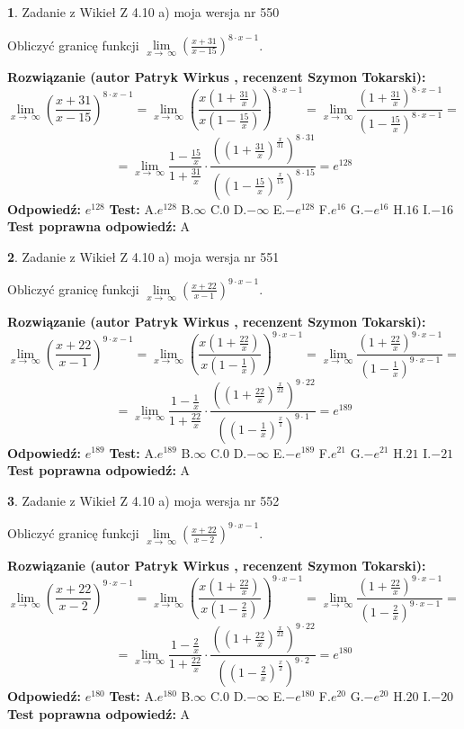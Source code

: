\documentclass[12pt, a4paper]{article}
\theoremstyle{definition} %
\newtheorem{zad}{}
\newcommand{\zadStart}[1]{\begin{zad}#1\newline}
\newcommand{\zadStop}{\end{zad}}
\newcommand{\rozwStart}[2]{\noindent \textbf{Rozwiązanie (autor #1 , recenzent #2): }\newline}
\newcommand{\rozwStop}{\newline}
\newcommand{\odpStart}{\noindent \textbf{Odpowiedź:}\newline}
\newcommand{\odpStop}{\newline}
\newcommand{\testStart}{\noindent \textbf{Test:}\newline}
\newcommand{\testStop}{\newline}
\newcommand{\kluczStart}{\noindent \textbf{Test poprawna odpowiedź:}\newline}
\newcommand{\kluczStop}{\newline}
\begin{document}
\zadStart{Zadanie z Wikieł Z 4.10 a) moja wersja nr 550}

Obliczyć granicę funkcji  $\lim\limits_{x\to\ \infty}(\frac{x+31}{x-15})^{8\cdot x-1}$.
\zadStop
\rozwStart{Patryk Wirkus}{Szymon Tokarski}
$$\lim\limits_{x\to\ \infty}(\frac{x+31}{x-15})^{8\cdot x-1} = \lim\limits_{x\to\ \infty}(\frac{x(1+\frac{31}{x})}{x(1-\frac{15}{x})})^{8\cdot x-1}=\lim\limits_{x\to\ \infty}\frac{(1+\frac{31}{x})^{8\cdot x-1}}{(1-\frac{15}{x})^{8\cdot x-1}}=$$
$$=\lim\limits_{x\to\ \infty}\frac{1-\frac{15}{x}}{1+\frac{31}{x}}\cdot\frac{((1+\frac{31}{x})^{\frac{x}{31}})^{8\cdot31}}{((1-\frac{15}{x})^{\frac{x}{15}})^{8\cdot15}}=e^{128}$$
\rozwStop
\odpStart
$e^{128}$
\odpStop
\testStart
A.$e^{128}$ B.$\infty$ C.$0$ D.$-\infty$ E.$-e^{128}$
F.$e^{16}$ G.$-e^{16}$
H.$16$
I.$-16$
\testStop
\kluczStart
A
\kluczStop



\zadStart{Zadanie z Wikieł Z 4.10 a) moja wersja nr 551}

Obliczyć granicę funkcji  $\lim\limits_{x\to\ \infty}(\frac{x+22}{x-1})^{9\cdot x-1}$.
\zadStop
\rozwStart{Patryk Wirkus}{Szymon Tokarski}
$$\lim\limits_{x\to\ \infty}(\frac{x+22}{x-1})^{9\cdot x-1} = \lim\limits_{x\to\ \infty}(\frac{x(1+\frac{22}{x})}{x(1-\frac{1}{x})})^{9\cdot x-1}=\lim\limits_{x\to\ \infty}\frac{(1+\frac{22}{x})^{9\cdot x-1}}{(1-\frac{1}{x})^{9\cdot x-1}}=$$
$$=\lim\limits_{x\to\ \infty}\frac{1-\frac{1}{x}}{1+\frac{22}{x}}\cdot\frac{((1+\frac{22}{x})^{\frac{x}{22}})^{9\cdot22}}{((1-\frac{1}{x})^{\frac{x}{1}})^{9\cdot1}}=e^{189}$$
\rozwStop
\odpStart
$e^{189}$
\odpStop
\testStart
A.$e^{189}$ B.$\infty$ C.$0$ D.$-\infty$ E.$-e^{189}$
F.$e^{21}$ G.$-e^{21}$
H.$21$
I.$-21$
\testStop
\kluczStart
A
\kluczStop



\zadStart{Zadanie z Wikieł Z 4.10 a) moja wersja nr 552}

Obliczyć granicę funkcji  $\lim\limits_{x\to\ \infty}(\frac{x+22}{x-2})^{9\cdot x-1}$.
\zadStop
\rozwStart{Patryk Wirkus}{Szymon Tokarski}
$$\lim\limits_{x\to\ \infty}(\frac{x+22}{x-2})^{9\cdot x-1} = \lim\limits_{x\to\ \infty}(\frac{x(1+\frac{22}{x})}{x(1-\frac{2}{x})})^{9\cdot x-1}=\lim\limits_{x\to\ \infty}\frac{(1+\frac{22}{x})^{9\cdot x-1}}{(1-\frac{2}{x})^{9\cdot x-1}}=$$
$$=\lim\limits_{x\to\ \infty}\frac{1-\frac{2}{x}}{1+\frac{22}{x}}\cdot\frac{((1+\frac{22}{x})^{\frac{x}{22}})^{9\cdot22}}{((1-\frac{2}{x})^{\frac{x}{2}})^{9\cdot2}}=e^{180}$$
\rozwStop
\odpStart
$e^{180}$
\odpStop
\testStart
A.$e^{180}$ B.$\infty$ C.$0$ D.$-\infty$ E.$-e^{180}$
F.$e^{20}$ G.$-e^{20}$
H.$20$
I.$-20$
\testStop
\kluczStart
A
\kluczStop
\end{document}
